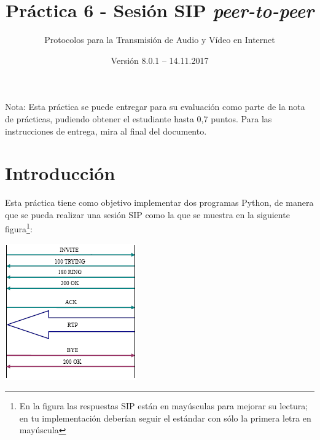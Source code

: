 \documentclass[a4paper,11pt]{article}
\begin{document}
\title{Práctica 6 - Sesión SIP \emph{peer-to-peer}}
\author{Protocolos para la Transmisión de Audio y Vídeo en Internet}
\date{Versión 8.0.1 – 14.11.2017}



\maketitle
\thispagestyle{empty}



Nota: Esta práctica se puede entregar para su evaluación como parte de la nota de prácticas, pudiendo obtener el estudiante hasta 0,7 puntos. Para las instrucciones de entrega, mira al final del documento.

\section*{Introducción}

Esta práctica tiene como objetivo implementar dos programas Python,
de manera que se pueda realizar una sesión SIP como la que se
muestra en la siguiente figura\footnote{En la figura las respuestas SIP están en 
mayúsculas para mejorar su lectura; en tu implementación deberían seguir el 
estándar con sólo la primera letra en mayúscula}:

\begin{center}
\includegraphics{figs/sip-invite.png}
\end{center}
\end{document}
